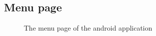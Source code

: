 \documentclass[11pt, a4paper]{article}
\begin{document}
\begin{appendices}
\subsection{Menu page} %
\begin{figure}[ht]
\centering
{}
\caption{The menu page of the android application}
\end{figure}
\clearpage


\end{appendices}
\end{document}
